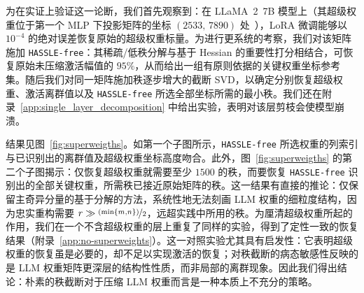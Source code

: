 \documentclass[11pt]{article}
\begin{document}
\begin{mainpart}
为在实证上验证这一论断，我们首先观察到：在 LLaMA~2~7B 模型上（其超级权重位于第一个 MLP 下投影矩阵的坐标 $(2533,\,7890)$ 处~\citep{SinksAndSpikes_2026}），LoRA 微调能够以 $10^{-4}$ 的绝对误差恢复原始的超级权重标量。为进行更系统的考察，我们对该矩阵施加 \texttt{HASSLE-free}：其稀疏/低秩分解与基于 Hessian 的重要性打分相结合，可恢复原始未压缩激活幅值的 $95\%$，从而给出一组有原则依据的关键权重坐标参考集。随后我们对同一矩阵施加秩逐步增大的截断 SVD，以确定分别恢复超级权重、激活离群值以及 \texttt{HASSLE-free} 所选全部坐标所需的最小秩。我们还在附录~\ref{app:single_layer_decomposition} 中给出实验，表明对该层剪枝会使模型崩溃。

结果见图~\ref{fig:superweigths}。如第一个子图所示，\texttt{HASSLE-free} 所选权重的列索引与已识别出的离群值及超级权重坐标高度吻合。此外，图~\ref{fig:superweigths} 的第二个子图揭示：仅恢复超级权重就需要至少 $1500$ 的秩，而要恢复 \texttt{HASSLE-free} 识别出的全部关键权重，所需秩已接近原始矩阵的秩。这一结果有直接的推论：仅保留主奇异分量的基于分解的方法，系统性地无法刻画 LLM 权重的细粒度结构，因为忠实重构需要 $r \gg \nicefrac{(\min \{m, n\})}{2}$，远超实践中所用的秩。为厘清超级权重所起的作用，我们在一个不含超级权重的层上重复了同样的实验，得到了定性一致的恢复结果（附录~\ref{app:no-superweights}）。这一对照实验尤其具有启发性：它表明超级权重的恢复虽是必要的，却不足以实现激活的恢复；对秩截断的病态敏感性反映的是 LLM 权重矩阵更深层的结构性性质，而非局部的离群现象。因此我们得出结论：朴素的秩截断对于压缩 LLM 权重而言是一种本质上不充分的策略。






\end{mainpart}
\end{document}
